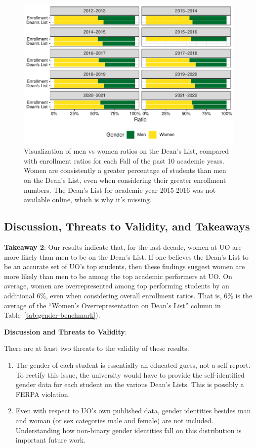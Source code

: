 \documentclass[10]{article}
\begin{document}
\begin{figure}[H]
	\centering
	\includegraphics[width=\linewidth]{../visualizations/gender3}
	\caption[Gender differences]{Visualization of men vs women ratios on the Dean's List, compared with enrollment ratios for each Fall of the past 10 academic years. Women are consistently a greater percentage of students than men on the Dean's List, even when considering their greater enrollment numbers. The Dean's List for academic year 2015-2016 was not available online, which is why it's missing.}
	\label{fig:gender}
\end{figure}


\subsection{Discussion, Threats to Validity, and Takeaways}

\textbf{Takeaway 2}: Our results indicate that, for the last decade, women at UO are more likely than men to be on the Dean's List. If one believes the Dean's List to be an accurate set of UO's top students, then these findings suggest women are more likely than men to be among the top academic performers at UO. On average, women are overrepresented among top performing students by an additional 6\%, even when considering overall enrollment ratios. That is, 6\% is the average of the ``Women's Overrepresentation on Dean's List'' column in Table~\ref{tab:gender-benchmark}).

\textbf{Discussion and Threats to Validity}:

There are at least two threats to the validity of these results.

\begin{enumerate}
	\item The gender of each student is essentially an educated guess, not a self-report. To rectify this issue, the university would have to provide the self-identified gender data for each student on the various Dean's Lists. This is possibly a FERPA violation.
	\item Even with respect to UO's own published data, gender identities besides man and woman (or sex categories male and female) are not included. Understanding how non-binary gender identities fall on this distribution is important future work.
\end{enumerate}
\end{document}
